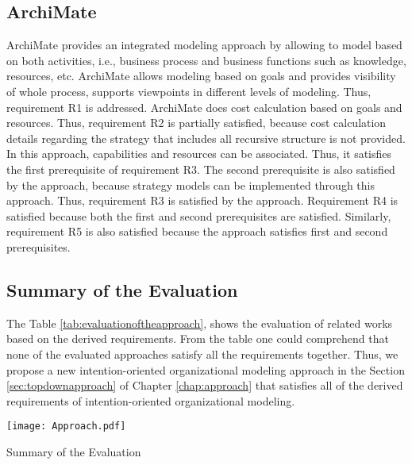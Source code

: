 \subsection{ArchiMate}
ArchiMate provides an integrated modeling approach by allowing to model based on both activities, i.e., business process and business functions such as knowledge, resources, etc. ArchiMate allows modeling based on goals and provides visibility of whole process, supports viewpoints in different levels of modeling. Thus, requirement R1 is addressed. ArchiMate does cost calculation based on goals and resources. Thus, requirement R2 is partially satisfied, because cost calculation details regarding the strategy that includes all recursive structure is not provided.  In this approach, capabilities and resources can be associated. Thus, it satisfies the first prerequisite of requirement R3. The second prerequisite is also satisfied by the approach, because strategy models can be implemented through this approach. Thus, requirement R3 is satisfied by the approach. Requirement R4 is satisfied because both the first and second prerequisites are satisfied. Similarly, requirement R5 is also satisfied because the approach satisfies first and second prerequisites.  

\subsection {Summary of the Evaluation}
 The Table \ref{tab:evaluationoftheapproach}, shows the evaluation of related works based on the derived requirements. From the table one could comprehend that none of the evaluated approaches satisfy all the requirements together. Thus, we propose a new intention-oriented organizational modeling approach in the Section \ref{sec:topdownapproach} of Chapter \ref{chap:approach} that satisfies all of the derived requirements of intention-oriented organizational modeling. 

 \begin{table}
 	\centering
 	\texttt{[image: Approach.pdf]}
 	\caption{Summary of the Evaluation}
 	\label{tab:evaluationoftheapproach}
 \end{table} 


